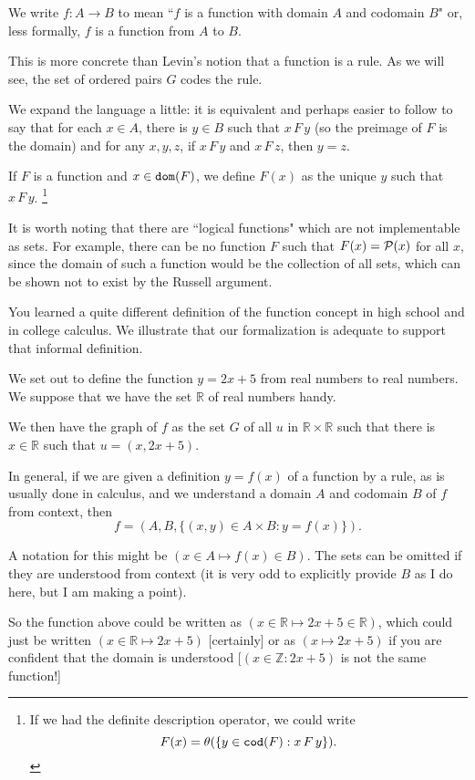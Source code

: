 \documentclass[12pt]{article}
\begin{document}
\begin{description}
We write $f:A \rightarrow B$ to mean ``$f$ is a function with domain $A$ and codomain $B$" or, less formally, $f$ is a function from $A$ to $B$.

This is more concrete than Levin's notion that a function is a rule.  As we will see, the set of ordered pairs $G$ codes the rule.

We expand the language a little:  it is equivalent and perhaps easier to follow to say that for each $x \in A$, there is $y \in B$ such that $x \, F\, y$ (so the preimage of $F$ is the domain) and for any $x,y,z$, if $x \, F \, y$ and $x \, F\, z$, then $y=z$.

If $F$ is a function and $x \in {\tt dom}(F)$, we define $F(x)$ as the unique $y$ such that $x \, F \, y$.  \footnote{If we had the definite description operator, we could write $$F(x) = \theta(\{y\in {\tt cod}(F):x \, F \, y\}).$$}

It is worth noting that there are ``logical functions" which are not implementable as sets.  For example,
there can be no function $F$ such that $F(x) = {\cal P}(x)$ for all $x$, since the domain of such a function would be the collection of all sets, which can be shown not to exist by the Russell argument.

You learned a quite different definition of the function concept in high school and in college calculus.  We illustrate that our formalization is adequate to support that informal definition.

We set out to define the function $y=2x+5$ from real numbers to real numbers.  We suppose that we have the set
$\mathbb R$ of real numbers handy.

We then have the graph of $f$ as the set $G$ of all $u$ in $\mathbb R \times \mathbb R$ such that there is $x \in \mathbb R$ such that $u = (x,2x+5)$.

In general, if we are given a definition $y = f(x)$ of a function by a rule, as is usually done in calculus, and we understand a domain $A$ and codomain $B$ of $f$ from context,
then $$f=(A,B,\{(x,y) \in A \times B:y=f(x)\}).$$

A notation for this might be $(x\in A \mapsto f(x)\in B)$.  The sets can be omitted if they are understood from context (it is very odd to explicitly provide $B$ as I do here, but I am making a point).

So the function above could be written as $(x \in \mathbb R \mapsto 2x+5 \in \mathbb R)$, which could just be written $(x \in \mathbb R \mapsto 2x+5)$ [certainly] or as
$(x \mapsto 2x+5)$ if you are confident that the domain is understood [$(x \in \mathbb Z:2x+5)$ is not the same function!]


\end{description}
\end{document}
